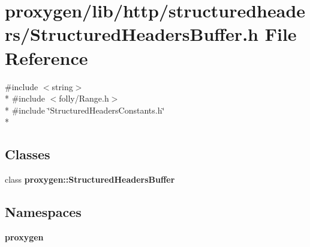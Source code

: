 \section{proxygen/lib/http/structuredheaders/\+Structured\+Headers\+Buffer.h File Reference}
\label{StructuredHeadersBuffer_8h}
{\ttfamily \#include $<$string$>$}\\*
{\ttfamily \#include $<$folly/\+Range.\+h$>$}\\*
{\ttfamily \#include \char`\"{}Structured\+Headers\+Constants.\+h\char`\"{}}\\*
\subsection*{Classes}
\begin{DoxyCompactItemize}
\item 
class {\bf proxygen\+::\+Structured\+Headers\+Buffer}
\end{DoxyCompactItemize}
\subsection*{Namespaces}
\begin{DoxyCompactItemize}
\item 
 {\bf proxygen}
\end{DoxyCompactItemize}
